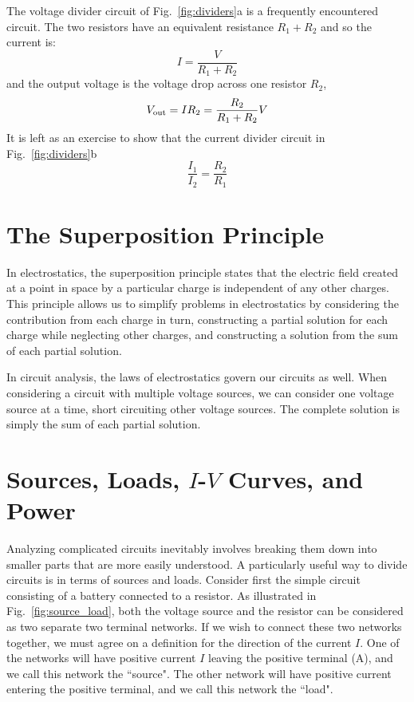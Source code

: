 \documentclass[12pt,oneside]{book}
\begin{document}
The voltage divider circuit of Fig.~\ref{fig:dividers}a is a frequently encountered circuit.  The two resistors have an equivalent resistance $R_1 + R_2$ and so the current is:
\begin{displaymath}
I = \frac{V}{R_1 + R_2} 
\end{displaymath}
and the output voltage is the voltage drop across one resistor $R_2$, 
\begin{displaymath}
V_{\rm out} = I R_2 = \frac{R_2}{R_1 + R_2} V
\end{displaymath}
It is left as an exercise to show that the current divider circuit in Fig.~\ref{fig:dividers}b 
\begin{equation} \label{eqn:idivider}
\frac{I_1}{I_2} = \frac{R_2}{R_1}
\end{equation}

\section{The Superposition Principle}

In electrostatics, the superposition principle states that the electric field created at a point in space by a particular charge is independent of any other charges.  This principle allows us to simplify problems in electrostatics by considering the contribution from each charge in turn, constructing a partial solution for each charge while neglecting other charges, and constructing a solution from the sum of each partial solution.

In circuit analysis, the laws of electrostatics govern our circuits as well.  When considering a circuit with multiple voltage sources, we can consider one voltage source at a time, short circuiting other voltage sources.  The complete solution is simply the sum of each partial solution.

\section{Sources, Loads, $I$-$V$ Curves, and Power}

Analyzing complicated circuits inevitably involves breaking them down into smaller parts that are more easily understood.   A particularly useful way to divide circuits is in terms of sources and loads.  Consider first the simple circuit consisting of a battery connected to a resistor.  As illustrated in Fig.~\ref{fig:source_load}, both the voltage source and the resistor can be considered as two separate two terminal networks.  If we wish to connect these two networks together, we must agree on a definition for the direction of the current $I$.  One of the networks will have positive current $I$ leaving the positive terminal (A), and we call this network the ``source".  The other network will have positive current entering the positive terminal, and we call this network the ``load".  
\end{document}
